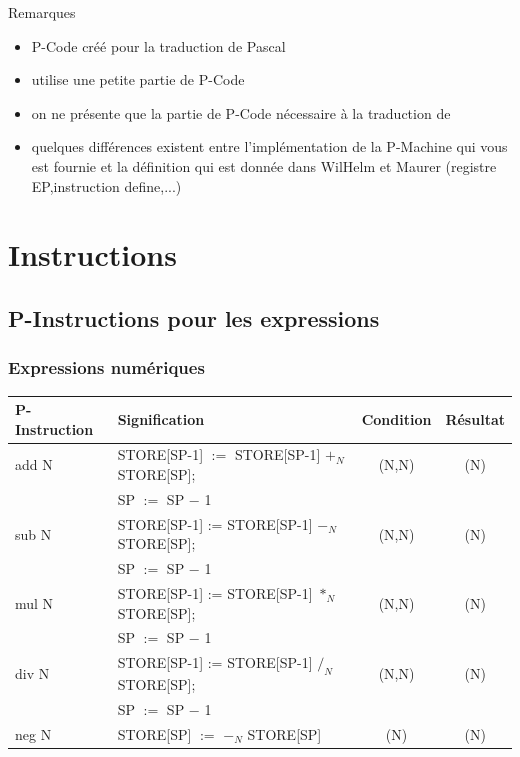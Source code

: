 \documentclass[french,11pt,twoside]{article}
\begin{document}
Remarques
\begin{itemize}
\item P-Code créé pour la traduction de Pascal
\item \lsd utilise une petite partie de P-Code
\item on ne présente que la partie de P-Code nécessaire à la traduction de \lsd
\item quelques différences existent entre l'implémentation de la P-Machine qui vous est fournie et la définition qui est donnée dans WilHelm et Maurer (registre EP,instruction define,...)
\end{itemize}


\section{Instructions}


\subsection{P-Instructions pour les expressions}

\subsubsection{Expressions numériques}

\begin{tabular}{|l|l|c|c|}
\hline
P-Instruction     & Signification                                                              & Condition & Résultat \\
\hline
add N                & STORE[SP-1] $:=$ STORE[SP-1] $+_N$ STORE[SP];    & (N,N)        & (N)\\
                         & SP $:=$ SP $-$ 1                                                      &                 & \\
sub N                & STORE[SP-1] := STORE[SP-1] $-_N$ STORE[SP];        & (N,N)         & (N)\\
                         & SP $:=$ SP $-$ 1                                                      &                 & \\
mul N                & STORE[SP-1] := STORE[SP-1] $*_N$ STORE[SP];        & (N,N)         & (N)\\
                         & SP $:=$ SP $-$ 1                                                      &                 & \\
div N                & STORE[SP-1] := STORE[SP-1] $/_N$ STORE[SP];        & (N,N)         & (N)\\
                         & SP $:=$ SP $-$ 1                                                      &                 & \\
neg N                & STORE[SP] $:=$ $-_N$ STORE[SP]                             & (N)            & (N)\\
\hline
\end{tabular}
\\
\end{document}

